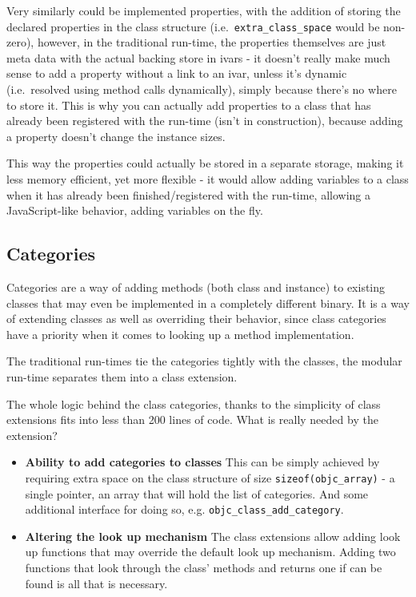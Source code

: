 Very similarly could be implemented properties, with the addition of storing the declared properties in the class structure (i.e.\ \verb=extra_class_space= would be non-zero), however, in the traditional run-time, the properties themselves are just meta data with the actual backing store in ivars - it doesn't really make much sense to add a property without a link to an ivar, unless it's dynamic (i.e.\ resolved using method calls dynamically), simply because there's no where to store it. This is why you can actually add properties to a class that has already been registered with the run-time (isn't in construction), because adding a property doesn't change the instance sizes.

This way the properties could actually be stored in a separate storage, making it less memory efficient, yet more flexible - it would allow adding variables to a class when it has already been finished/registered with the run-time, allowing a JavaScript-like behavior, adding variables on the fly.

\subsection{Categories}

Categories are a way of adding methods (both class and instance) to existing classes that may even be implemented in a completely different binary. It is a way of extending classes as well as overriding their behavior, since class categories have a priority when it comes to looking up a method implementation.

The traditional run-times tie the categories tightly with the classes, the modular run-time separates them into a class extension.

The whole logic behind the class categories, thanks to the simplicity of class extensions fits into less than 200 lines of code. What is really needed by the extension?

\begin{itemize}
  \item{\bf{Ability to add categories to classes}} This can be simply achieved by requiring extra space on the class structure of size \verb=sizeof(objc_array)= - a single pointer, an array that will hold the list of categories. And some additional interface for doing so, e.g. \verb=objc_class_add_category=.
  \item{\bf{Altering the look up mechanism}} The class extensions allow adding look up functions that may override the default look up mechanism. Adding two functions that look through the class' methods and returns one if can be found is all that is necessary.
\end{itemize}

